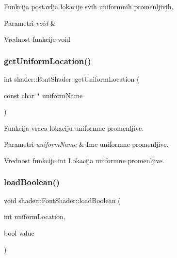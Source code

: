 Funkcija postavlja lokacije svih uniformnih promenljivih. 


\begin{DoxyParams}{Parametri}
{\em void} & \\
\hline
\end{DoxyParams}
\begin{DoxyReturn}{Vrednost funkcije}
void 
\end{DoxyReturn}
\mbox{\label{classshader_1_1FontShader_aa1ac58dc94c17fdf26121e8967ef87fd}} 
\subsubsection{\texorpdfstring{get\+Uniform\+Location()}{getUniformLocation()}}
{\footnotesize\ttfamily int shader\+::\+Font\+Shader\+::get\+Uniform\+Location (\begin{DoxyParamCaption}\item[{const char $\ast$}]{uniform\+Name }\end{DoxyParamCaption})}



Funkcija vraca lokaciju uniformne promenljive. 


\begin{DoxyParams}{Parametri}
{\em uniform\+Name} & Ime uniformne promenljive. \\
\hline
\end{DoxyParams}
\begin{DoxyReturn}{Vrednost funkcije}
int Lokacija uniformne promenljive. 
\end{DoxyReturn}
\mbox{\label{classshader_1_1FontShader_a4415b7e9a5f22561c9d10100c3d7b71e}} 
\subsubsection{\texorpdfstring{load\+Boolean()}{loadBoolean()}}
{\footnotesize\ttfamily void shader\+::\+Font\+Shader\+::load\+Boolean (\begin{DoxyParamCaption}\item[{int}]{uniform\+Location,  }\item[{bool}]{value }\end{DoxyParamCaption})}



